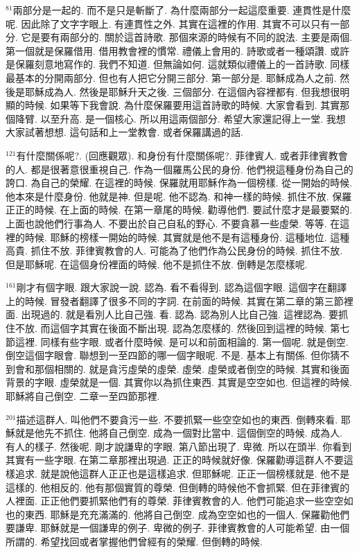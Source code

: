 \documentclass{book}
\begin{document}
$^{81}$兩部分是一起的.
而不是只是斬斷了.
為什麼兩部分一起這麼重要.
連貫性是什麼呢.
因此除了文字字眼上.
有連貫性之外.
其實在這裡的作用.
其實不可以只有一部分.
它是要有兩部分的.
關於這首詩歌.
那個來源的時候有不同的說法.
主要是兩個.
第一個就是保羅借用.
借用教會裡的慣常.
禮儀上會用的.
詩歌或者一種頌讚.
或許是保羅刻意地寫作的.
我們不知道.
但無論如何.
這就類似禮儀上的一首詩歌.
同樣最基本的分開兩部分.
但也有人把它分開三部分.
第一部分是.
耶穌成為人之前.
然後是耶穌成為人.
然後是耶穌升天之後.
三個部分.
在這個內容裡都有.
但我想很明顯的時候.
如果等下我會說.
為什麼保羅要用這首詩歌的時候.
大家會看到.
其實那個降臂.
以至升高.
是一個核心.
所以用這兩個部分.
希望大家還記得上一堂.
我想大家試著想想.
這句話和上一堂教會.
或者保羅講過的話.

$^{121}$有什麼關係呢?.
(回應觀眾).
和身份有什麼關係呢?.
菲律賓人.
或者菲律賓教會的人.
都是很著意很重視自己.
作為一個羅馬公民的身份.
他們視這種身份為自己的誇口.
為自己的榮耀.
在這裡的時候.
保羅就用耶穌作為一個榜樣.
從一開始的時候.
他本來是什麼身份.
他就是神.
但是呢.
他不認為.
和神一樣的時候.
抓住不放.
保羅正正的時候.
在上面的時候.
在第一章尾的時候.
勸導他們.
要試什麼才是最要緊的.
上面也說他們行事為人.
不要出於自己自私的野心.
不要貪慕一些虛榮.
等等.
在這裡的時候.
耶穌的榜樣一開始的時候.
其實就是他不是有這種身份.
這種地位.
這種高貴.
抓住不放.
菲律賓教會的人.
可能為了他們作為公民身份的時候.
抓住不放.
但是耶穌呢.
在這個身份裡面的時候.
他不是抓住不放.
倒轉是怎麼樣呢.

$^{161}$剛才有個字眼.
跟大家說一說.
認為.
看不看得到.
認為這個字眼.
這個字在翻譯上的時候.
冒發者翻譯了很多不同的字詞.
在前面的時候.
其實在第二章的第三節裡面.
出現過的.
就是看別人比自己強.
看.
認為.
認為別人比自己強.
這裡認為.
要抓住不放.
而這個字其實在後面不斷出現.
認為怎麼樣的.
然後回到這裡的時候.
第七節這裡.
同樣有些字眼.
或者什麼時候.
是可以和前面相論的.
第一個呢.
就是倒空.
倒空這個字眼會.
聯想到一至四節的哪一個字眼呢.
不是.
基本上有關係.
但你猜不到會和那個相關的.
就是貪污虛榮的虛榮.
虛榮.
虛榮或者倒空的時候.
其實和後面背景的字眼.
虛榮就是一個.
其實你以為抓住東西.
其實是空空如也.
但這裡的時候.
耶穌將自己倒空.
二章一至四節那裡.

$^{201}$描述這群人.
叫他們不要貪污一些.
不要抓緊一些空空如也的東西.
倒轉來看.
耶穌就是他先不抓住.
他將自己倒空.
成為一個對比當中.
這個倒空的時候.
成為人.
有人的樣子.
然後呢.
剛才說謙卑的字眼.
第八節出現了.
卑微.
所以在頭半.
你看到其實有一些字眼.
在第二章那裡出現過.
正正的時候就好像.
保羅勸導這群人不要這樣追求.
就是說他這群人正正也是這樣追求.
但耶穌呢.
正正一個榜樣就是.
他不是這樣的.
他相反的.
他有那個實質的尊榮.
但倒轉的時候他不會抓緊.
但在菲律賓的人裡面.
正正他們要抓緊他們有的尊榮.
菲律賓教會的人.
他們可能追求一些空空如也的東西.
耶穌是充充滿滿的.
他將自己倒空.
成為空空如也的一個人.
保羅勸他們要謙卑.
耶穌就是一個謙卑的例子.
卑微的例子.
菲律賓教會的人可能希望.
由一個所謂的.
希望找回或者掌握他們曾經有的榮耀.
但倒轉的時候.
\end{document}

